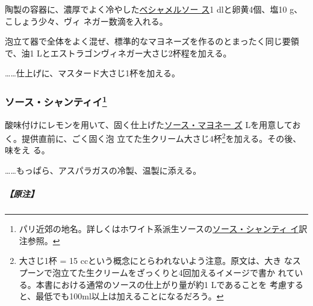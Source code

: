 \begin{recette}


陶製の容器に、濃厚でよく冷やした\protect\hyperlink{sauce-bechamel}{ベシャメルソー
ス}1\undemi{} dlと卵黄4個、塩10 g、こしょう少々、ヴィ
ネガー数滴を入れる。

泡立て器で全体をよく混ぜ、標準的なマヨネーズを作るのとまったく同じ要領
で、油1 Lとエストラゴンヴィネガー大さじ2杯程を加える。

\ldots{}\ldots{}仕上げに、マスタード大さじ1杯を加える。

\hypertarget{sauce-chantilly-froide}{%
\subsubsection[ソース・シャンティイ]{\texorpdfstring{ソース・シャンティイ\footnote{パリ近郊の地名。詳しくはホワイト系派生ソースの\protect\hyperlink{sauce-chantilly}{ソース・シャンティ
  イ}訳注参照。}}{ソース・シャンティイ}}\label{sauce-chantilly-froide}}



酸味付けにレモンを用いて、固く仕上げた\protect\hyperlink{mayonnaise}{ソース・マヨネー
ズ}\troisquarts{} Lを用意しておく。提供直前に、ごく固く泡
立てた生クリーム大さじ4杯\footnote{大さじ1杯 = 15
  ccという概念にとらわれないよう注意。原文は、大き
  なスプーンで泡立てた生クリームをざっくりと4回加えるイメージで書か
  れている。本書における通常のソースの仕上がり量が約1 Lであることを
  考慮すると、最低でも100ml以上は加えることになるだろう。}を加える。その後、味をえ
る。

\ldots{}\ldots{}もっぱら、アスパラガスの冷製、温製に添える。

\hypertarget{nota-sauce-chantilly-froide}{%
\subparagraph{【原注】}\label{nota-sauce-chantilly-froide}}


\end{recette}
